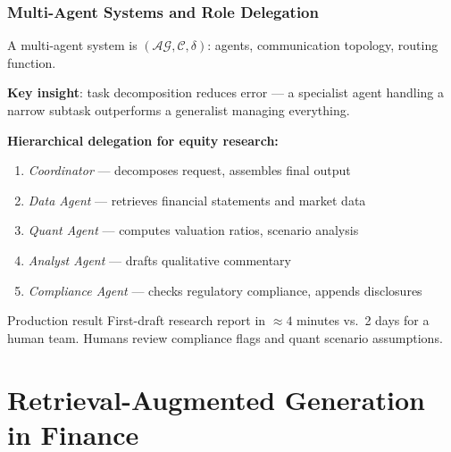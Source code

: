 \documentclass[9pt,t]{beamer}
\begin{document}
\begin{frame}
\frametitle{Multi-Agent Systems and Role Delegation}

A multi-agent system is $(\mathcal{AG}, \mathcal{C}, \delta)$:
agents, communication topology, routing function.

\textbf{Key insight}: task decomposition reduces error --- a specialist agent
handling a narrow subtask outperforms a generalist managing everything.

\medskip
\textbf{Hierarchical delegation for equity research:}
\begin{enumerate}
  \item \textit{Coordinator} --- decomposes request, assembles final output
  \item \textit{Data Agent} --- retrieves financial statements and market data
  \item \textit{Quant Agent} --- computes valuation ratios, scenario analysis
  \item \textit{Analyst Agent} --- drafts qualitative commentary
  \item \textit{Compliance Agent} --- checks regulatory compliance, appends disclosures
\end{enumerate}

\medskip
\begin{block}{Production result}
First-draft research report in $\approx 4$ minutes vs.\ 2 days for a human team.
Humans review compliance flags and quant scenario assumptions.
\end{block}
\end{frame}

\section{Retrieval-Augmented Generation in Finance}
\end{document}

